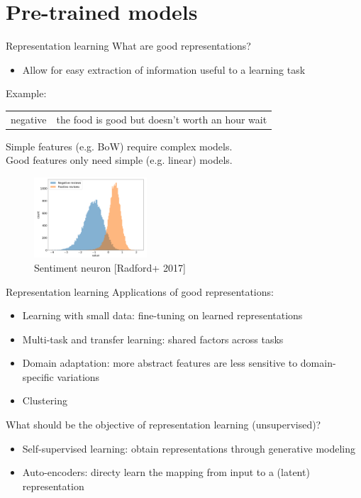\documentclass[usenames,dvipsnames,notes]{beamer}
\begin{document}
\section{Pre-trained models}

\begin{frame}
    {Representation learning}
    What are good representations?\\
    \begin{itemize}
        \item[] Allow for easy extraction of information useful to a learning task
    \end{itemize}
    Example:
    \vspace{-1em}
    \begin{table}
        \begin{tabular}{ll}
            negative & the food is good but doesn't worth an hour wait
        \end{tabular}
    \end{table}
    Simple features (e.g. BoW) require complex models.\\
    Good features only need simple (e.g. linear) models.
    \begin{figure}
        \includegraphics[height=3cm]{figures/sentiment}
        \caption{Sentiment neuron [Radford+ 2017]}
    \end{figure}
\end{frame}

\begin{frame}
    {Representation learning}
    Applications of good representations:\\
    \begin{itemize}
        \item Learning with small data: fine-tuning on learned representations
        \item Multi-task and transfer learning: shared factors across tasks
        \item Domain adaptation: more abstract features are less sensitive to domain-specific variations
        \item Clustering
    \end{itemize}

    What should be the objective of representation learning (unsupervised)?\\
    \begin{itemize}
        \item Self-supervised learning: obtain representations through generative modeling
        \item Auto-encoders: directy learn the mapping from input to a (latent) representation
    \end{itemize}
\end{frame}
\end{document}
